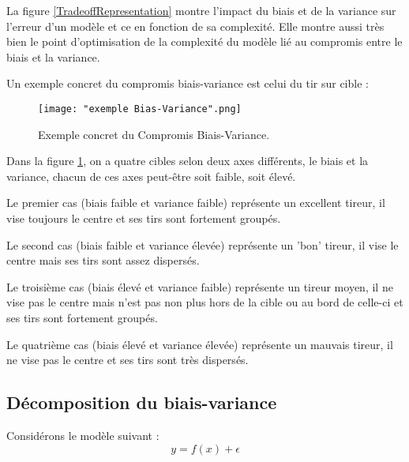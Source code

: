 \documentclass[a4paper]{article}
\begin{document}
La figure \ref{TradeoffRepresentation} montre l'impact du biais et de la variance sur l'erreur d'un modèle et ce en fonction de sa complexité. Elle montre aussi très bien le point d'optimisation de la complexité du modèle lié au compromis entre le biais et la variance.

\newpage

Un exemple concret du compromis biais-variance est celui du tir sur cible :

\begin{figure}[!h]
	\centering
	\texttt{[image: "exemple Bias-Variance".png]}
	\caption{Exemple concret du Compromis Biais-Variance.} \cite{UnderstandingBiasVarianceTradeoff}
	\label{ConcreteExample}
\end{figure}

Dans la figure \ref{ConcreteExample}, on a quatre cibles selon deux axes différents, le biais et la variance, chacun de ces axes peut-être soit faible, soit élevé. \par

Le premier cas (biais faible et variance faible) représente un excellent tireur, il vise toujours le centre et ses tirs sont fortement groupés. \par

Le second cas (biais faible et variance élevée) représente un 'bon' tireur, il vise le centre mais ses tirs sont assez dispersés. \par

Le troisième cas (biais élevé et variance faible) représente un tireur moyen, il ne vise pas le centre mais n'est pas non plus hors de la cible ou au bord de celle-ci et ses tirs sont fortement groupés. \par

Le quatrième cas (biais élevé et variance élevée) représente un mauvais tireur, il ne vise pas le centre et ses tirs sont très dispersés. \par

\newpage

\subsection{Décomposition du biais-variance}
\label{decomposition_Biais_Variance_section}

Considérons le modèle suivant : 
\begin{equation}
\label{decomposition_Biais_Variance}
y = f(x) + \epsilon
\end{equation}
\end{document}
